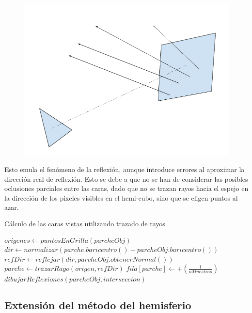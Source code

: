 \begin{figure}[htbp!]
	\centering
	\includegraphics[width=.8\linewidth]{assets/nose}
	\label{img:hibrido}
\end{figure}

Esto emula el fenómeno de la reflexión, aunque introduce errores al aproximar la dirección real de reflexión. Esto se debe a que no se han de considerar las posibles oclusiones parciales entre las caras, dado que no se trazan rayos hacia el espejo en la dirección de los pixeles visibles en el hemi-cubo, sino que se eligen puntos al azar.

\begin{algorithm}
	\caption{Cálculo de las caras vistas utilizando trazado de rayos}
	\label{alg:reflections}
	\fontsize{8}{8}\selectfont
	\begin{algorithmic}
			\State $origenes \gets puntosEnGrilla(parcheObj)$
				\State $dir \gets normalizar(parche.baricentro() - parcheObj.baricentro())$
				\State $refDir \gets reflejar(dir, parcheObj.obtenerNormal())$
				\State $parche \gets trazarRayo(origen, refDir)$
				\State $fila[parche] \gets +(\frac{1}{nMuestras})$
						\State $dibujarReflexiones(parcheObj, interseccion)$
					\EndIf
				\EndIf
			\EndLoop
		\EndFunction
	\end{algorithmic}
\end{algorithm}

\subsection{Extensión del método del hemisferio}

